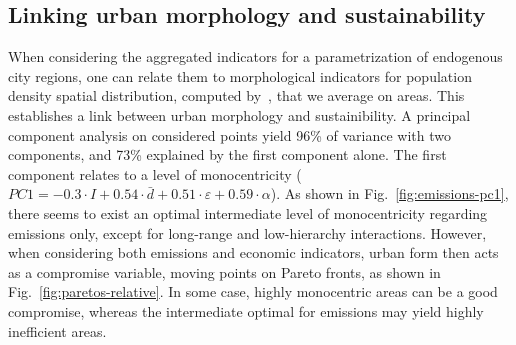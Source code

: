 \documentclass{jimis-en}
\begin{document}






\subsection{Linking urban morphology and sustainability}



When considering the aggregated indicators for a parametrization of endogenous city regions, one can relate them to morphological indicators for population density spatial distribution, computed by~\cite{raimbault2018calibration}, that we average on areas. This establishes a link between urban morphology and sustainibility. A principal component analysis on considered points yield 96\% of variance with two components, and 73\% explained by the first component alone. The first component relates to a level of monocentricity ($PC1 = -0.3\cdot I + 0.54 \cdot \bar{d} + 0.51\cdot \varepsilon + 0.59 \cdot \alpha$). As shown in Fig.~\ref{fig:emissions-pc1}, there seems to exist an optimal intermediate level of monocentricity regarding emissions only, except for long-range and low-hierarchy interactions. However, when considering both emissions and economic indicators, urban form then acts as a compromise variable, moving points on Pareto fronts, as shown in Fig.~\ref{fig:paretos-relative}. In some case, highly monocentric areas can be a good compromise, whereas the intermediate optimal for emissions may yield highly inefficient areas.
\end{document}
